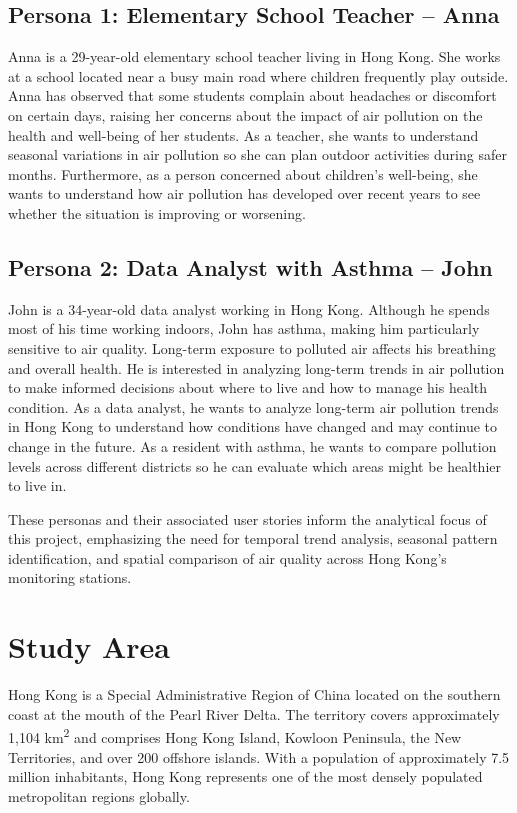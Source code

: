 \documentclass[manuscript,nonacm]{acmart}
\begin{document}
    \subsection{Persona 1: Elementary School Teacher – Anna}
    
    Anna is a 29-year-old elementary school teacher living in Hong Kong. She works at a school located near a busy main road where children frequently play outside. Anna has observed that some students complain about headaches or discomfort on certain days, raising her concerns about the impact of air pollution on the health and well-being of her students. As a teacher, she wants to understand seasonal variations in air pollution so she can plan outdoor activities during safer months. Furthermore, as a person concerned about children's well-being, she wants to understand how air pollution has developed over recent years to see whether the situation is improving or worsening.
    
    \subsection{Persona 2: Data Analyst with Asthma – John}
    
    John is a 34-year-old data analyst working in Hong Kong. Although he spends most of his time working indoors, John has asthma, making him particularly sensitive to air quality. Long-term exposure to polluted air affects his breathing and overall health. He is interested in analyzing long-term trends in air pollution to make informed decisions about where to live and how to manage his health condition. As a data analyst, he wants to analyze long-term air pollution trends in Hong Kong to understand how conditions have changed and may continue to change in the future. As a resident with asthma, he wants to compare pollution levels across different districts so he can evaluate which areas might be healthier to live in.

    These personas and their associated user stories inform the analytical focus of this project, emphasizing the need for temporal trend analysis, seasonal pattern identification, and spatial comparison of air quality across Hong Kong's monitoring stations.

\section{Study Area}
    Hong Kong is a Special Administrative Region of China located on the southern coast at the mouth of the Pearl River Delta. The territory covers approximately 1,104 km\textsuperscript{2} and comprises Hong Kong Island, Kowloon Peninsula, the New Territories, and over 200 offshore islands. With a population of approximately 7.5 million inhabitants, Hong Kong represents one of the most densely populated metropolitan regions globally.
\end{document}
